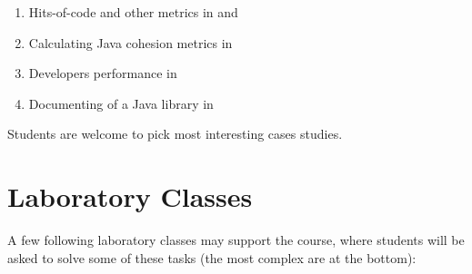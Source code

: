 \documentclass[nobrand,anonymous,nodate,nosecurity]{huawei}
\begin{document}
{\begin{enumerate}
  \item Hits-of-code and other metrics in  and 
  \item Calculating Java cohesion metrics in 
  \item Developers performance in 
  \item Documenting  of a Java library in 
\end{enumerate}

Students are welcome to pick most interesting cases studies.

\newpage
\section*{Laboratory Classes}

A few following laboratory classes may support the course, where students
will be asked to solve some of these tasks (the most complex are at the bottom):

}
\end{document}
